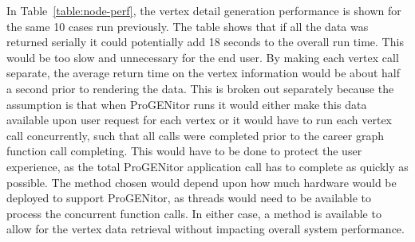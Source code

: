 In Table~\ref{table:node-perf}, the vertex detail generation performance is
shown for the same 10 cases run previously.  The table shows that if all the
data was returned serially it could potentially add 18 seconds to the overall
run time.  This would be too slow and unnecessary for the end user.  By making
each vertex call separate, the average return time on the vertex information
would be about half a second prior to rendering the data.  This is broken out
separately because the assumption is that when ProGENitor runs it would either
make this data available upon user request for each vertex or it would have to
run each vertex call concurrently, such that all calls were completed prior to
the career graph function call completing.  This would have to be done to
protect the user experience, as the total ProGENitor application call has to
complete as quickly as possible.  The method chosen would depend upon how much
hardware would be deployed to support ProGENitor, as threads would need to be
available to process the concurrent function calls.  In either case, a method is
available to allow for the vertex data retrieval without impacting overall
system performance.


